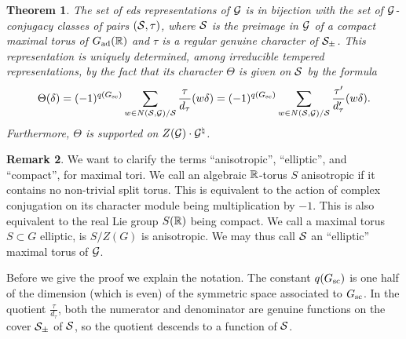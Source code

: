 \documentclass{article}
\newtheorem{thm}{Theorem}[subsection]
\theoremstyle{definition}
\newtheorem{rem}[thm]{Remark}
\numberwithin{equation}{section}
\renewcommand{\-}{\hyp{}}
\begin{document}
\begin{thm} \label{thm:eds}
The set of eds representations of $\mathcal{G}$ is in bijection with the set of $\mathcal{G}$-conjugacy classes of pairs $(\mathcal{S},\tau)$, where $\mathcal{S}$ is the preimage in $\mathcal{G}$ of a compact maximal torus of $G_{\textrm{ad}}(\mathbb{R})$ and $\tau$ is a regular genuine character of $\mathcal{S}_\pm$. This representation is uniquely determined, among irreducible tempered representations, by the fact that its character $\Theta$ is given on $\mathcal{S}$ by the formula
\begin{equation} \label{eq:charfmla}
		\Theta(\delta)=(-1)^{q(G_{\textrm{sc}})}\sum_{w \in N(\mathcal{S},\mathcal{G})/\mathcal{S}} \frac{\tau}{d_\tau}(w\delta) = (-1)^{q(G_{\textrm{sc}})}\sum_{w \in N(\mathcal{S},\mathcal{G})/\mathcal{S}} \frac{\tau'}{d'_\tau}(w\delta).
\end{equation}
Furthermore, $\Theta$ is supported on $Z(\mathcal{G})\cdot \mathcal{G}^\natural$.
\end{thm}

\begin{rem}
	We want to clarify the terms ``anisotropic'', ``elliptic'', and ``compact'', for maximal tori. We call an algebraic $\mathbb{R}$-torus $S$ anisotropic if it contains no non-trivial split torus. This is equivalent to the action of complex conjugation on its character module being multiplication by $-1$. This is also equivalent to the real Lie group $S(\mathbb{R})$ being compact. We call a maximal torus $S \subset G$ elliptic, is $S/Z(G)$ is anisotropic. We may thus call $\mathcal{S}$ an ``elliptic'' maximal torus of $\mathcal{G}$.
\end{rem}

Before we give the proof we explain the notation. The constant $q(G_{\textrm{sc}})$ is one half of the dimension (which is even) of the symmetric space associated to $G_{\textrm{sc}}$. In the quotient $\frac{\tau}{d_\tau}$, both the numerator and denominator are genuine functions on the cover $\mathcal{S}_\pm$ of $\mathcal{S}$, so the quotient descends to a function of $\mathcal{S}$.
\end{document}
